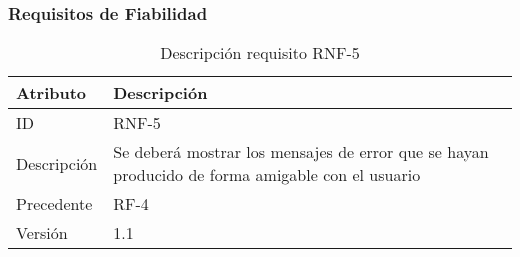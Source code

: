 \subsubsection{Requisitos de Fiabilidad}

\begin{table}[H]
    \label{tab:reqNF1}
 	\caption{Descripción requisito RNF-5}
	\centering

	\begin{tabular}{C{3cm}|C{12cm}}
 		\toprule
 		\textbf{Atributo} & \textbf{Descripción} \\
 		\midrule
 	    ID & RNF-5 \\
 	    Descripción & Se deberá mostrar los mensajes de error que se hayan producido de forma amigable con el usuario \\
 	    Precedente & RF-4 \\
 	    Versión & 1.1 \\
 		\bottomrule
 		\end{tabular}
\end{table}




